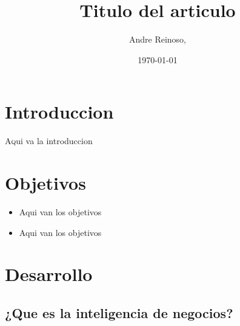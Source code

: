\documentclass[twoside,twocolumn]{article}
\title{Titulo del articulo}
\author{Andre Reinoso, }
\date{\today}
\begin{document}
\maketitle


\section{Introduccion}
\lettrine[nindent=0em,lines=3]{A}qui va la introduccion



\section{Objetivos}

\begin{itemize}
\item Aqui van los objetivos
\item Aqui van los objetivos

\end{itemize}




\section{Desarrollo}

\subsection{¿Que es la inteligencia de negocios?}
\end{document}
